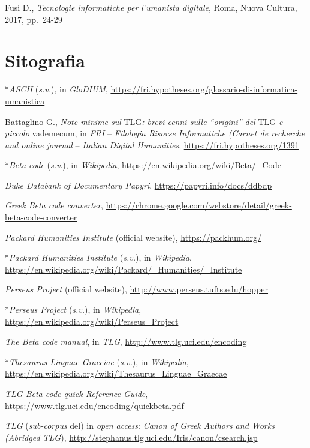 \documentclass[
  b5paper,
  twoside,
  12pt,
  chapterprefix=false,
  bibliography=totocnumbered,
  parskip=false]{scrbook}
\begin{document}
Fusi D., \emph{Tecnologie informatiche per l'umanista digitale}, Roma, Nuova
Cultura, 2017, pp.~24-29

\hypertarget{sitografia-1}{%
\section*{Sitografia}\label{sitografia-1}}

*\emph{ASCII} (\emph{s.v.}), in \emph{GloDIUM},
\url{https://fri.hypotheses.org/glossario-di-informatica-umanistica}

Battaglino G., \emph{Note minime sul} TLG\emph{: brevi cenni sulle \enquote{origini} del}
TLG \emph{e piccolo} vademecum, in \emph{FRI} -- \emph{Filologia Risorse Informatiche}
\emph{(Carnet de recherche and online journal} -- \emph{Italian Digital
Humanities},
\url{https://fri.hypotheses.org/1391}

*\emph{Beta code} (\emph{s.v}.), in \emph{Wikipedia},
\url{https://en.wikipedia.org/wiki/Beta/_Code}

\emph{Duke Databank of Documentary Papyri},
\url{https://papyri.info/docs/ddbdp}

\emph{Greek Beta code converter},
\url{https://chrome.google.com/webstore/detail/greek-beta-code-converter}

\emph{Packard Humanities Institute} (official website),
\url{https://packhum.org/}

*\emph{Packard Humanities Institute} (\emph{s.v.}), in \emph{Wikipedia},
\url{https://en.wikipedia.org/wiki/Packard/_Humanities/_Institute}

\emph{Perseus Project} (official website),
\url{http://www.perseus.tufts.edu/hopper}

*\emph{Perseus Project} (\emph{s.v.}), in \emph{Wikipedia},
\url{https://en.wikipedia.org/wiki/Perseus_Project}

\emph{The Beta code manual}, in \emph{TLG},
\url{http://www.tlg.uci.edu/encoding}

*\emph{Thesaurus Linguae Graeciae} (\emph{s.v.}), in \emph{Wikipedia},
\url{https://en.wikipedia.org/wiki/Thesaurus_Linguae_Graecae}

\emph{TLG Beta code quick Reference Guide},
\url{https://www.tlg.uci.edu/encoding/quickbeta.pdf}

\emph{TLG} (\emph{sub-corpus} del) in \emph{open access}: \emph{Canon of Greek Authors and
Works (Abridged TLG}),
\url{http://stephanus.tlg.uci.edu/Iris/canon/csearch.jsp}
\end{document}

